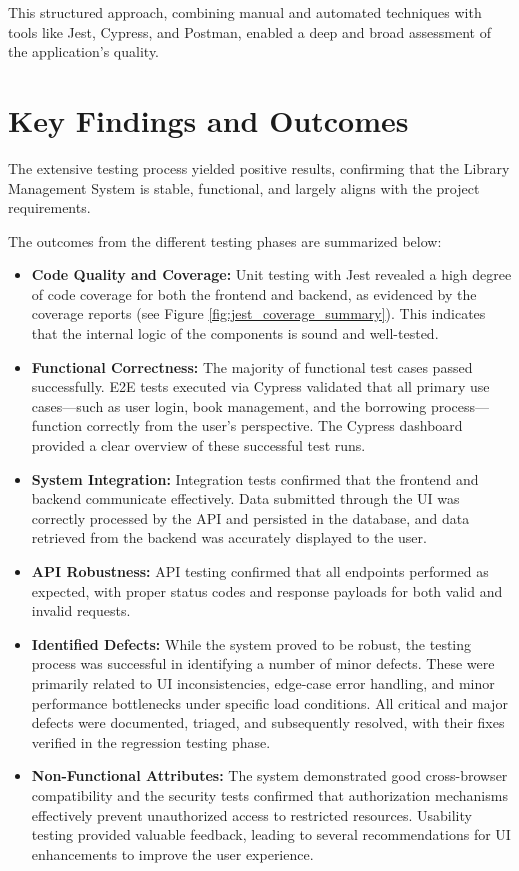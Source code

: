 This structured approach, combining manual and automated techniques with tools like Jest, Cypress, and Postman, enabled a deep and broad assessment of the application's quality.

\section{Key Findings and Outcomes}
\label{sec:key_findings}

The extensive testing process yielded positive results, confirming that the Library Management System is stable, functional, and largely aligns with the project requirements.

The outcomes from the different testing phases are summarized below:
\begin{itemize}
    \item \textbf{Code Quality and Coverage:} Unit testing with Jest revealed a high degree of code coverage for both the frontend and backend, as evidenced by the coverage reports (see Figure \ref{fig:jest_coverage_summary}). This indicates that the internal logic of the components is sound and well-tested.
    \item \textbf{Functional Correctness:} The majority of functional test cases passed successfully. E2E tests executed via Cypress validated that all primary use cases—such as user login, book management, and the borrowing process—function correctly from the user's perspective. The Cypress dashboard provided a clear overview of these successful test runs.
    \item \textbf{System Integration:} Integration tests confirmed that the frontend and backend communicate effectively. Data submitted through the UI was correctly processed by the API and persisted in the database, and data retrieved from the backend was accurately displayed to the user.
    \item \textbf{API Robustness:} API testing confirmed that all endpoints performed as expected, with proper status codes and response payloads for both valid and invalid requests.
    \item \textbf{Identified Defects:} While the system proved to be robust, the testing process was successful in identifying a number of minor defects. These were primarily related to UI inconsistencies, edge-case error handling, and minor performance bottlenecks under specific load conditions. All critical and major defects were documented, triaged, and subsequently resolved, with their fixes verified in the regression testing phase.
    \item \textbf{Non-Functional Attributes:} The system demonstrated good cross-browser compatibility and the security tests confirmed that authorization mechanisms effectively prevent unauthorized access to restricted resources. Usability testing provided valuable feedback, leading to several recommendations for UI enhancements to improve the user experience.
\end{itemize}

